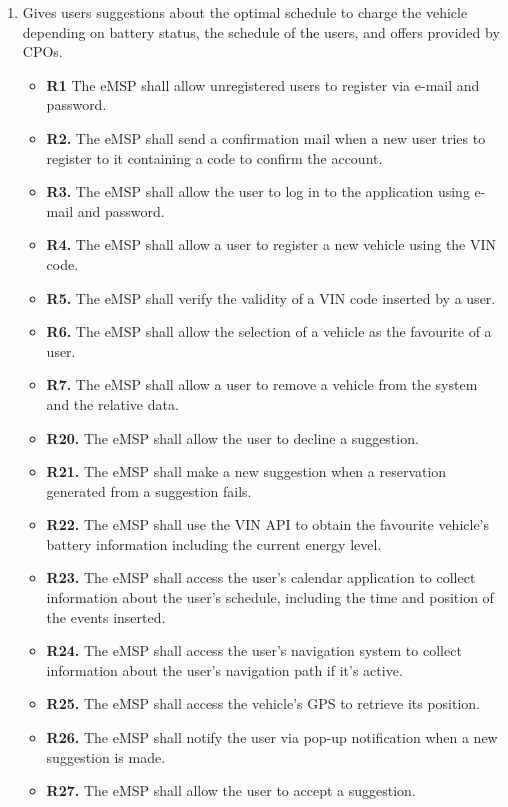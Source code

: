 \documentclass{Configuration_Files/PoliMi3i_thesis}
\begin{document}
\begin{enumerate}[label=\textbf{G\arabic*}]
    \item Gives users suggestions about the optimal schedule to charge the vehicle depending on battery status, the schedule of the users, and offers provided by CPOs.
        \begin{itemize}
            \item \textbf{R1} The eMSP shall allow unregistered users to register via e-mail and password.
            \item \textbf{R2.} The eMSP shall send a confirmation mail when a new user tries to register to it containing a code to confirm the account.
            \item \textbf{R3.} The eMSP shall allow the user to log in to the application using e-mail and password.
            \item \textbf{R4.} The eMSP shall allow a user to register a new vehicle using the VIN code.
            \item \textbf{R5.} The eMSP shall verify the validity of a VIN code inserted by a user.
            \item \textbf{R6.} The eMSP shall allow the selection of a vehicle as the favourite of a user.
            \item \textbf{R7.} The eMSP shall allow a user to remove a vehicle from the system and the relative data.
            \item \textbf{R20.} The eMSP shall allow the user to decline  a suggestion.
            \item \textbf{R21.} The eMSP shall make a new suggestion when a reservation generated from a suggestion fails.
            \item \textbf{R22.} The eMSP shall use the VIN API to obtain the favourite vehicle's battery information including the current energy level.
            \item \textbf{R23.} The eMSP shall access the user’s calendar application to collect information about the user’s schedule, including the time and position of the events inserted.
            \item \textbf{R24.} The eMSP shall access the user’s navigation system to collect information about the user’s navigation path if it's active.
            \item \textbf{R25.} The eMSP shall access the vehicle’s GPS to retrieve its position.
            \item \textbf{R26.} The eMSP shall notify the user via pop-up notification when a new suggestion is made.
            \item \textbf{R27.} The eMSP shall allow the user to accept a suggestion.

\end{itemize}
\end{enumerate}
\end{document}
